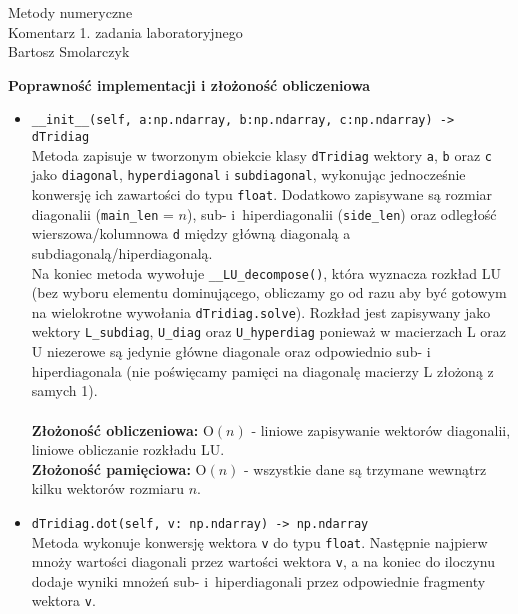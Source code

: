 \documentclass[12pt]{article}
\newcommand{\code}{\texttt}
\begin{document}
\begin{center}
	{\Huge Metody numeryczne}\\[7pt]
	Komentarz 1. zadania laboratoryjnego\\
	Bartosz Smolarczyk
\end{center}
\begin{center}
\textbf{Poprawność implementacji i złożoność obliczeniowa}
\end{center}
\begin{itemize}
\item \code{\_\_init\_\_(self, a:np.ndarray, b:np.ndarray, c:np.ndarray) -> dTridiag}
\vspace{1mm}\\
Metoda zapisuje w tworzonym obiekcie klasy \code{dTridiag} wektory \code{a}, \code{b} oraz \code{c} jako \code{diagonal}, \code{hyperdiagonal} i \code{subdiagonal}, wykonując jednocześnie konwersję ich zawartości do typu \code{float}. Dodatkowo zapisywane są rozmiar diagonalii (\code{main\_len} = $n$), sub- \mbox{i hiperdiagonalii} (\code{side\_len}) oraz odległość wierszowa/kolumnowa \code{d} między główną diagonalą a subdiagonalą/hiperdiagonalą.\\
Na koniec metoda wywołuje \code{\_\_LU\_decompose()}, która wyznacza rozkład LU (bez \mbox{wyboru} elementu dominującego, obliczamy go od razu aby być gotowym na wielokrotne wywołania \code{dTridiag.solve}). Rozkład jest zapisywany jako wektory \code{L\_subdiag}, \code{U\_diag} oraz \code{U\_hyperdiag} ponieważ w macierzach L oraz U niezerowe są jedynie główne diagonale oraz odpowiednio sub- i hiperdiagonala (nie poświęcamy pamięci na diagonalę macierzy L złożoną z samych 1).\\
\\
\textbf{Złożoność obliczeniowa:} O$(n)$ - liniowe zapisywanie wektorów diagonalii, liniowe obliczanie rozkładu LU.\\
\textbf{Złożoność pamięciowa:} O$(n)$ - wszystkie dane są trzymane wewnątrz kilku wektorów rozmiaru $n$.
\vspace{5mm}
\item \code{dTridiag.dot(self, v: np.ndarray) -> np.ndarray}
\vspace{1mm}\\
Metoda wykonuje konwersję wektora \code{v} do typu \code{float}. Następnie najpierw mnoży \mbox{wartości} diagonali przez wartości wektora \code{v}, a na koniec do iloczynu dodaje wyniki mnożeń sub- \mbox{i hiperdiagonali} przez odpowiednie fragmenty wektora \code{v}.\\

\end{itemize}
\end{document}
